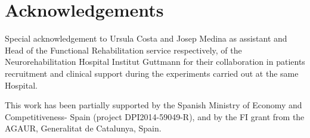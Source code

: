 \section{Acknowledgements}
Special acknowledgement to Ursula Costa and Josep Medina as assistant and Head of the Functional Rehabilitation service respectively, of the Neurorehabilitation Hospital Institut Guttmann for their collaboration in patients recruitment and clinical support during the experiments carried out at the same Hospital.

This work has been partially supported by the Spanish Ministry of Economy and Competitiveness- Spain (project DPI2014-59049-R), and by the FI grant from the AGAUR, Generalitat de Catalunya, Spain.




















